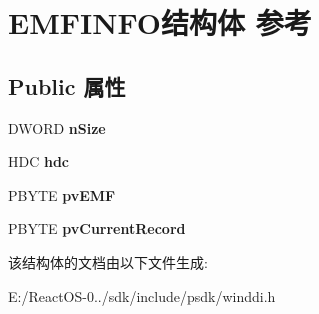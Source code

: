 \hypertarget{struct_e_m_f_i_n_f_o}{}\section{E\+M\+F\+I\+N\+F\+O结构体 参考}
\label{struct_e_m_f_i_n_f_o}
\subsection*{Public 属性}
\begin{DoxyCompactItemize}
\item 
\mbox{\label{struct_e_m_f_i_n_f_o_a320310a53f8c7beeeade4b279b7238a2}} 
D\+W\+O\+RD {\bfseries n\+Size}
\item 
\mbox{\label{struct_e_m_f_i_n_f_o_afba36cf30b404bf26d7c57403bf9708e}} 
H\+DC {\bfseries hdc}
\item 
\mbox{\label{struct_e_m_f_i_n_f_o_a222cbffed0033bf13f7425c3d98a4bc3}} 
P\+B\+Y\+TE {\bfseries pv\+E\+MF}
\item 
\mbox{\label{struct_e_m_f_i_n_f_o_a636dba61f4ce42b9a2da191d99942a8d}} 
P\+B\+Y\+TE {\bfseries pv\+Current\+Record}
\end{DoxyCompactItemize}


该结构体的文档由以下文件生成\+:\begin{DoxyCompactItemize}
\item 
E\+:/\+React\+O\+S-\/0../sdk/include/psdk/winddi.\+h\end{DoxyCompactItemize}
